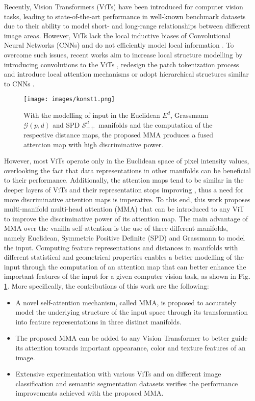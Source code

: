 \documentclass[10pt,twocolumn,letterpaper]{article}
\begin{document}
Recently, Vision Transformers (ViTs) \cite{Author3} have been introduced for computer vision tasks, leading to state-of-the-art performance in well-known benchmark datasets due to their ability to model short- and long-range relationships between different image areas. However, ViTs lack the local inductive biases of Convolutional Neural Networks (CNNs) and do not efficiently model local information \cite{Author5}. To overcome such issues, recent works aim to increase local structure modelling by introducing convolutions to the ViTs \cite{Author1,Author5,Author6}, redesign the patch tokenization process and introduce local attention mechanisms \cite{Author8,Author9,Author48,Author50} or adopt hierarchical structures similar to CNNs \cite{Author8,Author10,Author11}.

\begin{figure}[t]
  \centering
  \texttt{[image: images/konst1.png]}
  \caption{With the modelling of input in the Euclidean $E^d$, Grassmann $\mathcal{G}(p,d)$ and SPD $\mathcal{S}_{++}^d$ manifolds and the computation of the respective distance maps, the proposed MMA produces a fused attention map with high discriminative power.}
  \label{fig:motivation}
\end{figure}

However, most ViTs operate only in the Euclidean space of pixel intensity values, overlooking the fact that data representations in other manifolds can be beneficial to their performance. Additionally, the attention maps tend to be similar in the deeper layers of ViTs and their representation stops improving \cite{Author30}, thus a need for more discriminative attention maps is imperative. To this end, this work proposes multi-manifold multi-head attention (MMA) that can be introduced to any ViT to improve the discriminative power of its attention map. The main advantage of MMA over the vanilla self-attention is the use of three different manifolds, namely Euclidean, Symmetric Positive Definite (SPD) and Grassmann to model the input. Computing feature representations and distances in manifolds with different statistical and geometrical properties enables a better modelling of the input through the computation of an attention map that can better enhance the important features of the input for a given computer vision task, as shown in Fig. \ref{fig:motivation}. More specifically, the contributions of this work are the following:
\begin{itemize}
\item A novel self-attention mechanism, called MMA, is proposed to accurately model the underlying structure of the input space through its transformation into feature representations in three distinct manifolds.
\item The proposed MMA can be added to any Vision Transformer to better guide its attention towards important appearance, color and texture features of an image.
\item Extensive experimentation with various ViTs and on different image classification and semantic segmentation datasets verifies the performance improvements achieved with the proposed MMA.
\end{itemize}
\end{document}

